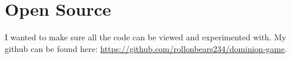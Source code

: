\documentclass[11pt, oneside]{article}   	%
\begin{document}
\section{Open Source}

I wanted to make sure all the code can be viewed and experimented with. My github can be found here: \url{https://github.com/rollonbears234/dominion-game}. 



\end{document}
